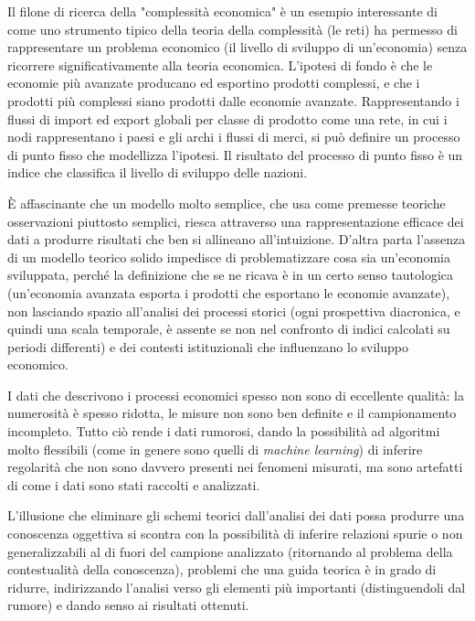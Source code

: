 \documentclass[a4paper, headings=standardclasses]{scrartcl}
\begin{document}
Il filone di ricerca della "complessità economica" \parencite{hidalgo2021} è un esempio interessante di come uno strumento tipico della teoria della complessità (le reti) ha permesso di rappresentare un problema economico (il livello di sviluppo di un'economia) senza ricorrere significativamente alla teoria economica.
L'ipotesi di fondo è che le economie più avanzate producano ed esportino prodotti complessi, e che i prodotti più complessi siano prodotti dalle economie avanzate.
Rappresentando i flussi di import ed export globali per classe di prodotto come una rete, in cui i nodi rappresentano i paesi e gli archi i flussi di merci, si può definire un processo di punto fisso che modellizza l'ipotesi.
Il risultato del processo di punto fisso è un indice che classifica il livello di sviluppo delle nazioni.

È affascinante che un modello molto semplice, che usa come premesse teoriche osservazioni piuttosto semplici, riesca attraverso una rappresentazione efficace dei dati a produrre risultati che ben si allineano all'intuizione.
D'altra parta l'assenza di un modello teorico solido impedisce di problematizzare cosa sia un'economia sviluppata, perché la definizione che se ne ricava è in un certo senso tautologica (un'economia avanzata esporta i prodotti che esportano le economie avanzate), non lasciando spazio all'analisi dei processi storici (ogni prospettiva diacronica, e quindi una scala temporale, è assente se non nel confronto di indici calcolati su periodi differenti) e dei contesti istituzionali che influenzano lo sviluppo economico.

I dati che descrivono i processi economici spesso non sono di eccellente qualità: la numerosità è spesso ridotta, le misure non sono ben definite e il campionamento incompleto.
Tutto ciò rende i dati rumorosi, dando la possibilità ad algoritmi molto flessibili (come in genere sono quelli di \textit{machine learning}) di inferire regolarità che non sono davvero presenti nei fenomeni misurati, ma sono artefatti di come i dati sono stati raccolti e analizzati.

L'illusione che eliminare gli schemi teorici dall'analisi dei dati possa produrre una conoscenza oggettiva si scontra con la possibilità di inferire relazioni spurie o non generalizzabili al di fuori del campione analizzato (ritornando al problema della contestualità della conoscenza), problemi che una guida teorica è in grado di ridurre, indirizzando l'analisi verso gli elementi più importanti (distinguendoli dal rumore) e dando senso ai risultati ottenuti.
\end{document}
